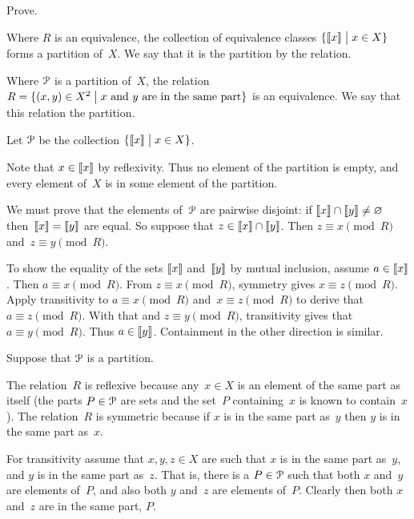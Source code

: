 \documentclass{ibl}  %
\begin{document}
\begin{ex} \label{ex:EquivClassesFormPartition}
Prove.
\begin{exes}
\item Where $R$ is an equivalence, 
  the collection of equivalence classes 
  $\{\llbracket x \rrbracket \bigm| x\in X\}$ forms a partition of~$X$.
  We say that it is the partition  by the relation.
\item Where $\EuScript{P}$ is a partition of~$X$, 
  the relation 
  $R=\{(x,y)\in X^2 \bigm| \text{$x$ and~$y$ are in the same part}\}$ 
  is an equivalence.
  We say that this relation  the partition. 
\end{exes}
\begin{ans}
\begin{exes}
\item Let $\EuScript{P}$ be the collection $\{\llbracket x \rrbracket \bigm| x\in X\}$.
 
  Note that $x\in\llbracket x \rrbracket$ by reflexivity.
  Thus no element of the partition is empty, and 
  every element of~$X$ is in some element of the partition.

  We must prove that the elements of~$\EuScript{P}$ are pairwise disjoint:
  if $\llbracket x \rrbracket\cap\llbracket y \rrbracket\neq\varnothing$
  then~$\llbracket x \rrbracket=\llbracket y \rrbracket$ are equal.
  So suppose that $z\in\llbracket x \rrbracket\cap\llbracket y \rrbracket$.
  Then $z\equiv x\pmod R$ and~$z\equiv y\pmod R$.

  To show the equality of the sets $\llbracket x \rrbracket$ and~$\llbracket y \rrbracket$ 
  by mutual inclusion, assume $a\in\llbracket x \rrbracket$.
  Then $a\equiv x\pmod R$.
  From $z\equiv x\pmod R$, symmetry gives $x\equiv z\pmod R$.
  Apply transitivity to $a\equiv x\pmod R$ and~$x\equiv z\pmod R$ to
  derive that $a\equiv z\pmod R$.
  With that and $z\equiv y\pmod R$, transitivity gives
  that $a\equiv y\pmod R$. 
  Thus $a\in\llbracket y \rrbracket$.
  Containment in the other direction is similar.  
\item Suppose that $\EuScript{P}$ is a partition. 

  The relation~$R$ is reflexive because any~$x\in X$ is an element of
  the same part as itself
  (the parts $P\in\EuScript{P}$ are sets and the set~$P$ containing~$x$
  is known to contain~$x$).
  The relation~$R$ is symmetric because if $x$ is in the same part as~$y$
  then $y$ is in the same part as~$x$.

  For transitivity assume that $x,y,z\in X$ are such that 
  $x$ is in the same part as~$y$, and 
  $y$ is in the same part as~$z$.
  That is, there is a $P\in\EuScript{P}$ such that
  both $x$ and~$y$ are elements of~$P$, 
  and also both $y$ and~$z$ are elements of~$P$.
  Clearly then both $x$ and~$z$ are in the same part, $P$.
\end{exes}
\end{ans}
\end{ex}
\end{document}

